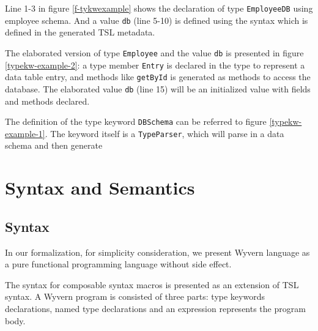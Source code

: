 \documentclass{sig-alternate}
\begin{document}
Line 1-3 in figure \ref{f-tykwexample} shows the declaration of type \verb|EmployeeDB| using employee schema. And a value \verb|db| (line 5-10) is defined using the syntax which is defined in the generated TSL metadata. 

The elaborated version of type \verb|Employee| and the value \verb|db| is presented in figure \ref{typekw-example-2}: a type member \verb|Entry| is declared in the type to represent a data table entry, and methods like \verb|getById| is generated as methods to access the database. The elaborated value \verb|db| (line 15) will be an initialized value with fields and methods declared.

The definition of the type keyword \verb|DBSchema| can be referred to figure \ref{typekw-example-1}. The keyword itself is a \verb|TypeParser|, which will parse in a data schema and then generate 

\section{Syntax and Semantics}\label{theory}
\subsection{Syntax}
In our formalization, for simplicity consideration, we present Wyvern language as a pure functional programming language without side effect.

The syntax for composable syntax macros is presented as an extension of TSL syntax. A Wyvern program is consisted of three parts: type keywords declarations, named type declarations and an expression represents the program body. 
\end{document}
